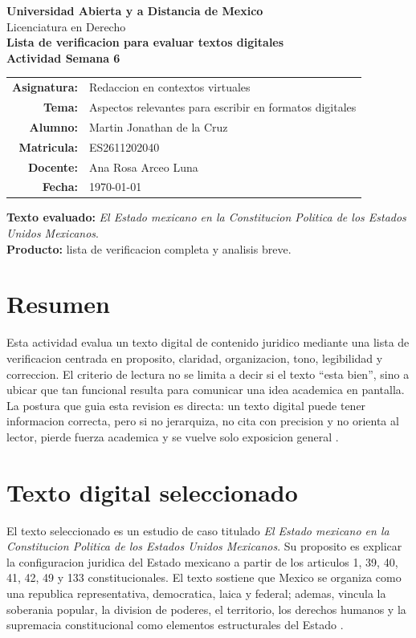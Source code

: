 \documentclass[12pt,letterpaper,oneside]{article}
\begin{document}
\begin{titlepage}
\centering
\vspace*{1cm}
{\Large \textbf{Universidad Abierta y a Distancia de Mexico}}\\[0.4cm]
{\large Licenciatura en Derecho}\\[1.2cm]

{\LARGE \textbf{Lista de verificacion para evaluar textos digitales}}\\[0.3cm]
{\large \textbf{Actividad Semana 6}}\\[1.2cm]

\begin{tabular}{rl}
\textbf{Asignatura:} & Redaccion en contextos virtuales \\
\textbf{Tema:} & Aspectos relevantes para escribir en formatos digitales \\
\textbf{Alumno:} & Martin Jonathan de la Cruz \\
\textbf{Matricula:} & ES2611202040 \\
\textbf{Docente:} & Ana Rosa Arceo Luna \\
\textbf{Fecha:} & \today \\
\end{tabular}

\vfill
\textbf{Texto evaluado:} \emph{El Estado mexicano en la Constitucion Politica de los Estados Unidos Mexicanos}.\\
\textbf{Producto:} lista de verificacion completa y analisis breve.
\end{titlepage}

\section*{Resumen}
Esta actividad evalua un texto digital de contenido juridico mediante una lista de verificacion centrada en proposito, claridad, organizacion, tono, legibilidad y correccion. El criterio de lectura no se limita a decir si el texto ``esta bien'', sino a ubicar que tan funcional resulta para comunicar una idea academica en pantalla. La postura que guia esta revision es directa: un texto digital puede tener informacion correcta, pero si no jerarquiza, no cita con precision y no orienta al lector, pierde fuerza academica y se vuelve solo exposicion general \citep{nunez2015,correa2018}.

\section{Texto digital seleccionado}
El texto seleccionado es un estudio de caso titulado \emph{El Estado mexicano en la Constitucion Politica de los Estados Unidos Mexicanos}. Su proposito es explicar la configuracion juridica del Estado mexicano a partir de los articulos 1, 39, 40, 41, 42, 49 y 133 constitucionales. El texto sostiene que Mexico se organiza como una republica representativa, democratica, laica y federal; ademas, vincula la soberania popular, la division de poderes, el territorio, los derechos humanos y la supremacia constitucional como elementos estructurales del Estado \citep{constitucion2026}.
\end{document}

